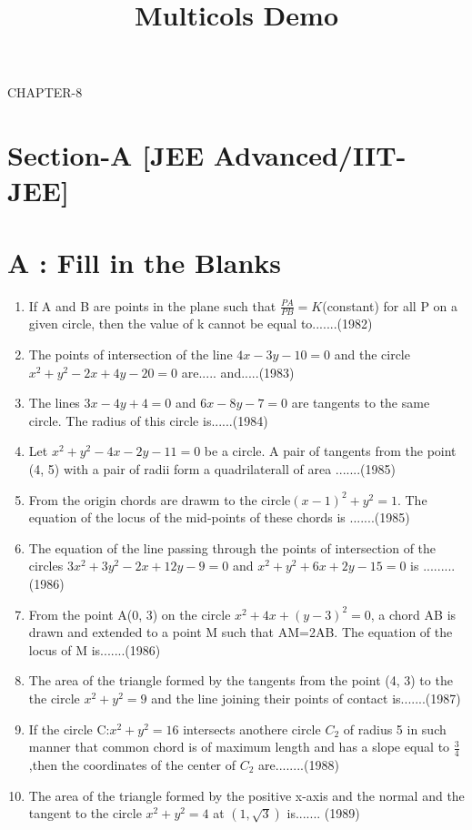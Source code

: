 \documentclass[12pt]{article}
\title{Multicols Demo}
\begin{document}
\begin{center}
\textbf\large{CHAPTER-8 \\ }

\end{center}
\fi
\section*{Section-A    [JEE Advanced/IIT-JEE]}
\section*{A    :  Fill in the Blanks}
\begin{enumerate}
\item If A and B are points in the plane such that $\frac{PA}{PB}=K$(constant) for all P on a given circle, then the value of k cannot be equal to.......(1982)
\item The points of intersection of the line $4x-3y-10=0$ and the circle $x^2+y^2-2x+4y-20=0$ are..... and.....(1983)
\item The lines $3x-4y +4=0$ and $6x-8y-7=0$ are tangents to the same circle. The radius of this circle is......(1984)
\item Let $x^2+y^2-4x-2y-11=0$ be a circle. A pair of tangents from the point (4, 5) with a pair of radii form a quadrilaterall of area .......(1985)
\item From the origin chords are drawm to the circle$(x- 1)^2+y^2=1$. The equation of the locus of the mid-points of these chords is .......(1985)
\item The equation of the line passing through the points of intersection of the circles $3x^2+3y^2-2x+12y-9=0$ and $x^2+y^2+6x+2y-15=0$ is .........(1986)
\item From the point A(0, 3) on the circle $x^2+4x+(y-3)^2=0$, a chord AB is drawn and extended to a point M such that AM=2AB. The equation of the locus of M is.......(1986)
\item The area of the triangle formed by the tangents from the point (4, 3) to the the circle $x^2+y^2=9$ and the line joining their points of contact is.......(1987)
\item If the circle C:$x^2+y^2=16$ intersects anothere circle $C_2$ of radius 5 in such manner that common chord is of maximum length and has a slope equal to $\frac{3}{4}$,then the coordinates of the center of $C_2$ are........(1988)
\item The area of the triangle formed by the positive x-axis and the normal and the tangent to the circle $x^2+y^2=4$ at $(1,\sqrt{3})$ is....... (1989)

\end{enumerate}
\end{document}

